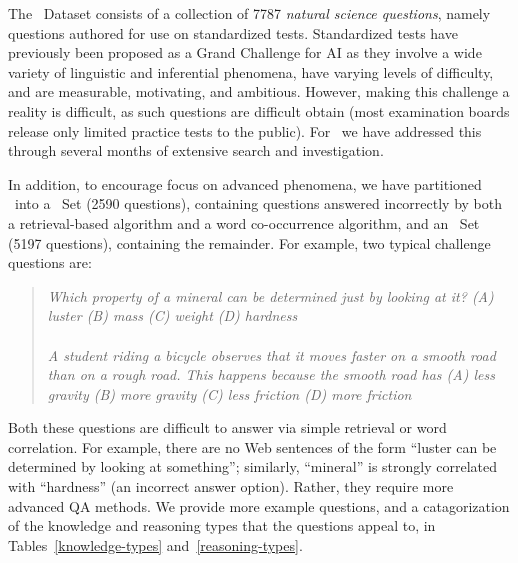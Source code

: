 The \ASC~Dataset consists of a collection of 7787 {\it natural science questions}, namely questions
authored for use on standardized tests. Standardized
tests have previously been proposed as a Grand Challenge for
AI \cite{darpa,aimagazine2016} as they involve a wide variety of
linguistic and inferential phenomena, have varying levels
of difficulty, and are measurable, motivating, and ambitious.
However, making this challenge a reality
is difficult, as such questions are difficult
obtain (most examination boards release only limited practice
tests to the public). For \ASC~we have addressed this 
through several months of extensive search and investigation.

In addition, to encourage focus on advanced phenomena, we have
partitioned \ASC~into a \Challenge~Set (2590 questions), containing questions answered
incorrectly by both a retrieval-based algorithm and a word co-occurrence
algorithm, and an \Additional~Set (5197 questions), containing the remainder.
For example, two typical challenge questions are:
\begin{quote}
  {\it Which property of a mineral can be determined just by looking at it? (A) luster {\bfit [correct]} (B) mass (C) weight (D) hardness} \\
  \\
 {\it A student riding a bicycle observes that it moves faster on a smooth road than on a rough road. This happens because the smooth road has (A) less gravity (B) more gravity (C) less friction {\bfit [correct]} (D) more friction}
\end{quote}
\vspace{1mm}
Both these questions are difficult to answer via simple retrieval or word correlation. For example, there are no Web sentences of the form ``luster can be determined by looking at something''; similarly, ``mineral'' is strongly correlated with ``hardness'' (an incorrect answer option). Rather, they require more advanced QA methods. We provide more example questions, and a catagorization of the knowledge and reasoning types that the questions appeal to, in Tables~\ref{knowledge-types} and~\ref{reasoning-types}.

